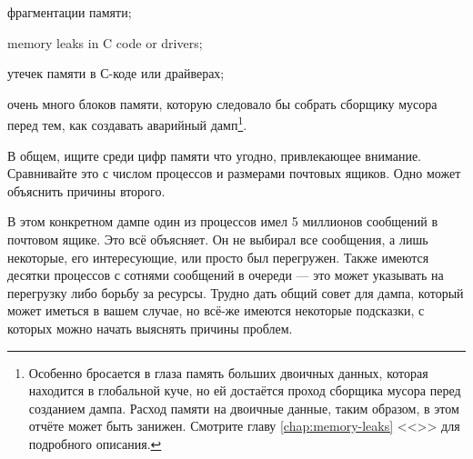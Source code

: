 \documentclass[11pt, oneside]{book}   	%
\newcommand\NamedRef[1]{\ref{#1} <<\nameref{#1}>>}
\begin{document}
\begin{itemize*}
	\item фрагментации памяти;
	
	\item memory leaks in C code or drivers;
	\item утечек памяти в С-коде или драйверах;
	
	\item очень много блоков памяти, которую следовало бы собрать сборщику мусора перед тем, как создавать аварийный дамп\footnote{Особенно бросается в глаза память больших двоичных данных, которая находится в глобальной куче, но ей достаётся проход сборщика мусора перед созданием дампа. Расход памяти на двоичные данные, таким образом, в этом отчёте может быть занижен. Смотрите главу \NamedRef{chap:memory-leaks} для подробного описания.}.
\end{itemize*}

В общем, ищите среди цифр памяти что угодно, привлекающее внимание. Сравнивайте это с числом процессов и размерами почтовых ящиков. Одно может объяснить причины второго.

В этом конкретном дампе один из процессов имел 5 миллионов сообщений в почтовом ящике. Это всё объясняет. Он не выбирал все сообщения, а лишь некоторые, его интересующие, или просто был перегружен. Также имеются десятки процессов с сотнями сообщений в очереди --- это может указывать на перегрузку либо борьбу за ресурсы. Трудно дать общий совет для дампа, который может иметься в вашем случае, но всё-же имеются некоторые подсказки, с которых можно начать выяснять причины проблем.
\end{document}
